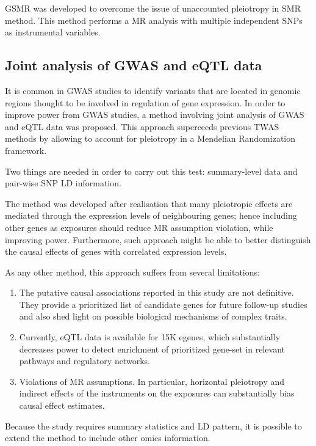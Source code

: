 \documentclass[]{book}
\theoremstyle{definition}
\theoremstyle{definition}
\theoremstyle{definition}
\theoremstyle{remark}
\begin{document}
GSMR was developed to overcome the issue of unaccounted pleiotropy in
SMR method. This method performs a MR analysis with multiple independent
SNPs as instrumental variables.

\subsection{Joint analysis of GWAS and eQTL
data}\label{joint-analysis-of-gwas-and-eqtl-data}

It is common in GWAS studies to identify variants that are located in
genomic regions thought to be involved in regulation of gene expression.
In order to improve power from GWAS studies, a method involving joint
analysis of GWAS and eQTL data was proposed. This approach superceeds
previous TWAS methods by allowing to account for pleiotropy in a
Mendelian Randomization framework.

Two things are needed in order to carry out this test: summary-level
data and pair-wise SNP LD information.

The method was developed after realisation that many pleiotropic effects
are mediated through the expression levels of neighbouring genes; hence
including other genes as exposures should reduce MR assumption
violation, while improving power. Furthermore, such approach might be
able to better distinguish the causal effects of genes with correlated
expression levels.

As any other method, this approach suffers from several limitations:

\begin{enumerate}
\def\labelenumi{\arabic{enumi})}
\item
  The putative causal associations reported in this study are not
  definitive. They provide a prioritized list of candidate genes for
  future follow-up studies and also shed light on possible biological
  mechanisms of complex traits.
\item
  Currently, eQTL data is available for 15K egenes, which substantially
  decreases power to detect enrichment of prioritized gene-set in
  relevant pathways and regulatory networks.
\item
  Violations of MR assumptions. In particular, horizontal pleiotropy and
  indirect effects of the instruments on the exposures can substantially
  bias causal effect estimates.
\end{enumerate}

Because the study requires summary statistics and LD pattern, it is
possible to extend the method to include other omics information.
\end{document}
